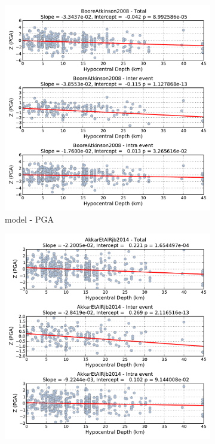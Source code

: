 \begin{figure}[htb]
  \centering
  \begin{subfigure}[b]{0.49\textwidth}
      \includegraphics[width=\textwidth]{./figures/residuals/BA2008_HypoDepth_PGA.pdf}
      \caption{\textcite{boore2008} model - PGA}
      \label{fig:pga_depth_ba2008}
  \end{subfigure}
    \begin{subfigure}[b]{0.49\textwidth}
      \includegraphics[width=\textwidth]{./figures/residuals/Akkar2014_HypoDepth_PGA.pdf}

\end{subfigure}
\end{figure}

